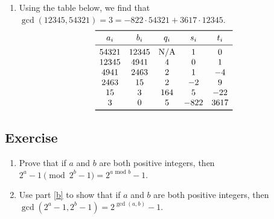 \documentclass{article}
\newcounter{counter}
\newcommand{\Exercise}{Exercise \stepcounter{counter}\thecounter}
\begin{document}
\begin{enumerate}
        \vspace{3mm}
        To express $\gcd(12345, 54321)$ as a linear combination of $12345$ and $54321$, we work backwards from our work shown in the Euclidean algorithm:
        \begin{align*}
            \gcd(12345, 54321) = 3 &= 2463 - 164 \cdot 15 \\
            &= 2463 - 164 \cdot (4941 - 2 \cdot 2463) \\
            &= 329 \cdot 2463 - 164 \cdot 4941 \\
            &= 329 \cdot (12345 - 2 \cdot 4941) - 164 \cdot 4941 \\
            &= 329 \cdot 12345 - 822 \cdot 4941 \\
            &= 329 \cdot 12345 - 822 \cdot (54321 - 4 \cdot 12345) \\
            &= -822 \cdot 54321 + 3617 \cdot 12345
        \end{align*}
        \item Using the table below, we find that $\gcd(12345, 54321) = 3 = -822 \cdot 54321 + 3617 \cdot 12345$.
        $$\begin{array}{ccccc}
            \toprule
            a_{i} & b_{i} & q_{i} & s_{i} & t_{i} \\
            \midrule
            54321 & 12345 & \text{N/A} & 1 & 0 \\
            12345 & 4941 & 4 & 0 & 1 \\
            4941 & 2463 & 2 & 1 & -4 \\
            2463 & 15 & 2 & -2 & 9 \\
            15 & 3 & 164 & 5 & -22 \\
            3 & 0 & 5 & -822 & 3617 \\
            \bottomrule
        \end{array}$$
    \end{enumerate}

\subsection*{\Exercise}
    \begin{enumerate}
        \item \label{b} Prove that if $a$ and $b$ are both positive integers, then $2^{a} - 1 \pmod{2^{b} - 1} = 2^{a \text{ mod $b$}} - 1$.
        
        \item Use part \ref{b} to show that if $a$ and $b$ are both positive integers, then $\gcd(2^{a} - 1, 2^{b} - 1) = 2^{\gcd(a, b)} - 1$.
    \end{enumerate}
\end{document}
